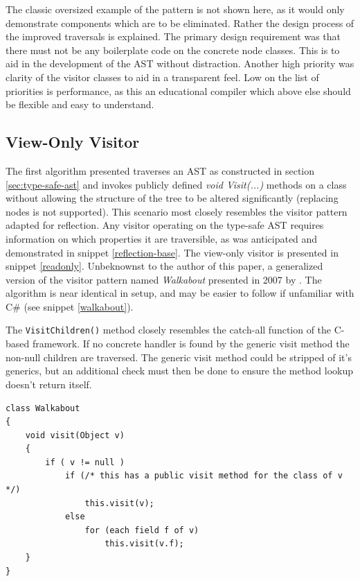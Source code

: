 \documentclass[twoside,openright]{uva-bachelor-thesis}
\newcommand{\code}[1]{\texttt{\footnotesize#1}}
\begin{document}
		The classic oversized example of the pattern is not shown here, as it would only demonstrate components which are to be eliminated. Rather the design process of the improved traversals is explained. The primary design requirement was that there must not be any boilerplate code on the concrete node classes. This is to aid in the development of the AST without distraction. Another high priority was clarity of the visitor classes to aid in a transparent feel. Low on the list of priorities is performance, as this an educational compiler which above else should be flexible and easy to understand.
		
		\subsection{View-Only Visitor}
			The first algorithm presented traverses an AST as constructed in section \ref{sec:type-safe-ast} and invokes publicly defined \emph{void Visit(...)} methods on a class without allowing the structure of the tree to be altered significantly (replacing nodes is not supported). This scenario most closely resembles the visitor pattern adapted for reflection. Any visitor operating on the type-safe AST requires information on which properties it are traversible, as was anticipated and demonstrated in snippet \ref{reflection-base}. The view-only visitor is presented in snippet \ref{readonly}. Unbeknownst to the author of this paper, a generalized version of the visitor pattern named \emph{Walkabout} presented in 2007 by \citeauthor{palsberg1998essence}. The algorithm is near identical in setup, and may be easier to follow if unfamiliar with C\# (see snippet \ref{walkabout}).
			
			The \code{VisitChildren()} method closely resembles the catch-all function of the C-based framework. If no concrete handler is found by the generic visit method the non-null children are traversed. The generic visit method could be stripped of it's generics, but an additional check must then be done to ensure the method lookup doesn't return itself.
						
			\begin{lstlisting}[caption=Walkabout algorithm by \citeauthor{palsberg1998essence},label=walkabout]
class Walkabout
{
	void visit(Object v)
	{
		if ( v != null )
			if (/* this has a public visit method for the class of v */)
				this.visit(v);
			else
				for (each field f of v)
					this.visit(v.f);
	}
}
			\end{lstlisting}
						
\end{document}
